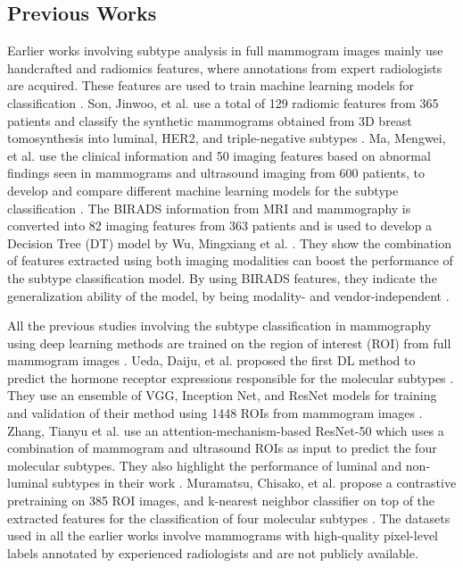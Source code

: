 \documentclass{article}
\begin{document}
\subsection{Previous Works}

Earlier works involving subtype analysis in full mammogram images mainly use handcrafted and radiomics features, where annotations from expert radiologists are acquired. These features are used to train machine learning models for classification \cite {son2020prediction, ma2022predicting, wu2019prediction}. Son, Jinwoo, et al. use a total of 129 radiomic features from 365 patients and classify the synthetic mammograms obtained from 3D breast tomosynthesis into luminal, HER2, and triple-negative subtypes \cite{son2020prediction}. Ma, Mengwei, et al. use the clinical information and 50 imaging features based on abnormal findings seen in mammograms and ultrasound imaging from 600 patients, to develop and compare different machine learning models for the subtype classification \cite{ma2022predicting}. The BIRADS information from MRI and mammography is converted into 82 imaging features from 363 patients and is used to develop a Decision Tree (DT) model by Wu, Mingxiang et al. \cite{wu2019prediction}. They show the combination of features extracted using both imaging modalities can boost the performance of the subtype classification model. By using BIRADS features, they indicate the generalization ability of the model, by being modality- and vendor-independent \cite{wu2019prediction}.  

All the previous studies involving the subtype classification in mammography using deep learning methods are trained on the region of interest (ROI) from full mammogram images \cite {ueda2021training, muramatsu2022intrinsic, zhang2021predicting}. Ueda, Daiju, et al. proposed the first DL method to predict the hormone receptor expressions responsible for the molecular subtypes \cite{ueda2021training}. They use an ensemble of VGG, Inception Net, and ResNet models for training and validation of their method using 1448 ROIs from mammogram images \cite{ueda2021training}. Zhang, Tianyu et al. use an attention-mechanism-based ResNet-50 which uses a combination of mammogram and ultrasound ROIs as input to predict the four molecular subtypes. They also highlight the performance of luminal and non-luminal subtypes in their work \cite{zhang2021predicting}. Muramatsu, Chisako, et al. propose a contrastive pretraining on 385 ROI images, and k-nearest neighbor classifier on top of the extracted features for the classification of four molecular subtypes \cite{muramatsu2022intrinsic}. The datasets used in all the earlier works involve mammograms with high-quality pixel-level labels annotated by experienced radiologists and are not publicly available. 
\end{document}
